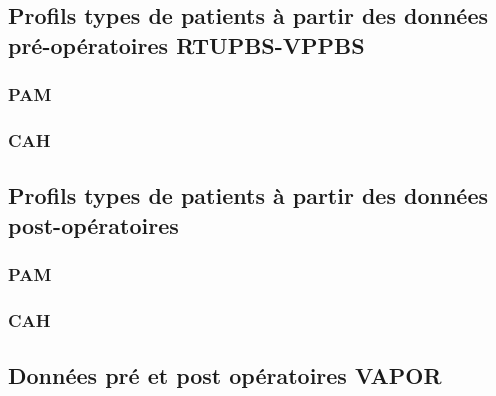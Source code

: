 \subsection{Profils types de patients à partir des données pré-opératoires RTUPBS-VPPBS}
\subsubsection{PAM}

\subsubsection{CAH}


\subsection{Profils types de patients à partir des données post-opératoires}
\subsubsection{PAM}

\subsubsection{CAH}


\subsection{Données pré et post opératoires VAPOR}